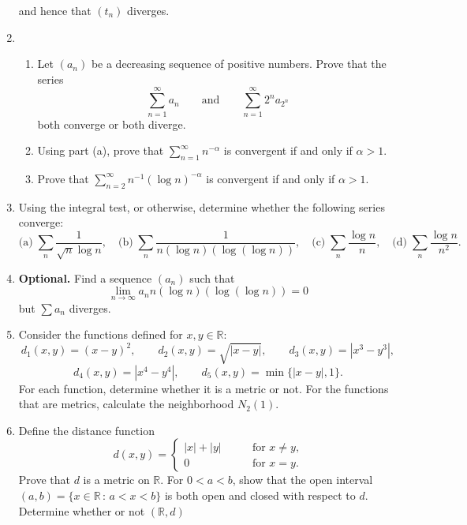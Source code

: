 \documentclass[12pt]{article}
\newcommand{\R}{\mathbb{R}}
\newcommand{\sep}{\,:\,}
\begin{document}
\begin{enumerate}
    and hence that $(t_n)$ diverges.
  \item
    \begin{enumerate}
      \item Let $(a_n)$ be a decreasing sequence of positive numbers. Prove
        that the series
        \begin{equation}
          \sum_{n=1}^\infty a_n  \qquad \text{and} \qquad \sum_{n=1}^\infty 2^n a_{2^n}
        \end{equation}
        both converge or both diverge.
      \item Using part (a), prove that $\sum_{n=1}^\infty n^{-\alpha}$ is convergent if and only if $\alpha>1$.
      \item Prove that $\sum_{n=2}^\infty n^{-1} (\log n)^{-\alpha}$ is convergent if and only if $\alpha>1$.
    \end{enumerate}
  \item
    Using the integral test, or otherwise, determine whether the following series converge:
    \[
      \textrm{(a)}\;\sum_n \frac{1}{\sqrt{n}\log n}, \quad
      \textrm{(b)}\;\sum_n \frac{1}{n(\log n)(\log(\log n))}, \quad
      \textrm{(c)}\;\sum_n \frac{\log n}{n}, \quad
      \textrm{(d)}\;\sum_n \frac{\log n}{n^2}.
    \]
  \item \textbf{Optional.} Find a sequence $(a_n)$ such that
    \begin{equation}
      \lim_{n\to\infty} a_n n(\log n)(\log(\log n)) =0
    \end{equation}
    but $\sum a_n$ diverges.
  \item Consider the functions defined for $x,y\in \R$:
    \[
      d_1(x,y) = (x-y)^2, \qquad d_2(x,y) = \sqrt{|x-y|}, \qquad d_3(x,y) = |x^3-y^3|,
    \]
    \[
      d_4(x,y) = |x^4 - y^4|, \qquad d_5(x,y) = \min \{ |x-y|, 1\}.
    \]
    For each function, determine whether it is a metric or not. For the
    functions that are metrics, calculate the neighborhood $N_2(1)$.
  \item Define the distance function
    \begin{equation}
      d(x,y) = \begin{cases}
        |x|+ |y| & \qquad \text{for $x\ne y$,} \\
        0 & \qquad \text{for $x=y$.}
      \end{cases}
    \end{equation}
    Prove that $d$ is a metric on $\R$. For $0<a<b$, show that the
    open interval $(a,b) = \{x \in \R \sep a<x<b\}$ is both open
    and closed with respect to $d$. Determine whether or not $(\R,d)$

\end{enumerate}
\end{document}
